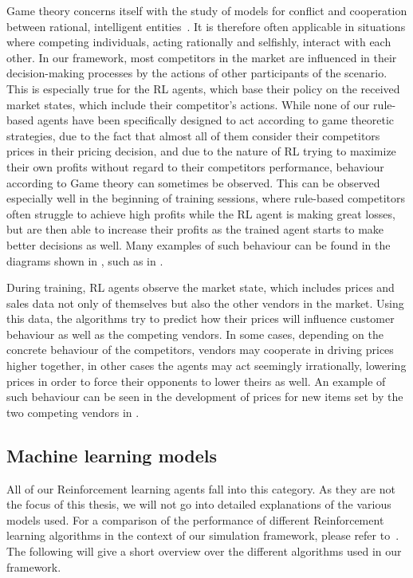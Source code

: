 Game theory concerns itself with the study of models for conflict and cooperation between rational, intelligent entities~\cite{GameTheory}. It is therefore often applicable in situations where competing individuals, acting rationally and selfishly, interact with each other. In our framework, most competitors in the market are influenced in their decision-making processes by the actions of other participants of the scenario. This is especially true for the RL agents, which base their policy on the received market states, which include their competitor's actions. While none of our rule-based agents have been specifically designed to act according to game theoretic strategies, due to the fact that almost all of them consider their competitors prices in their pricing decision, and due to the nature of RL trying to maximize their own profits without regard to their competitors performance, behaviour according to Game theory can sometimes be observed. This can be observed especially well in the beginning of training sessions, where rule-based competitors often struggle to achieve high profits while the RL agent is making great losses, but are then able to increase their profits as the trained agent starts to make better decisions as well. Many examples of such behaviour can be found in the diagrams shown in , such as in .

During training, RL agents observe the market state, which includes prices and sales data not only of themselves but also the other vendors in the market. Using this data, the algorithms try to predict how their prices will influence customer behaviour as well as the competing vendors. In some cases, depending on the concrete behaviour of the competitors, vendors may cooperate in driving prices higher together, in other cases the agents may act seemingly irrationally, lowering prices in order to force their opponents to lower theirs as well. An example of such behaviour can be seen in the development of prices for new items set by the two competing vendors in .

\subsection{Machine learning models}\label{subsec:MachineLearningModels}

All of our Reinforcement learning agents fall into this category. As they are not the focus of this thesis, we will not go into detailed explanations of the various models used. For a comparison of the performance of different Reinforcement learning algorithms in the context of our simulation framework, please refer to~\cite{JanThesis}. The following will give a short overview over the different algorithms used in our framework.

